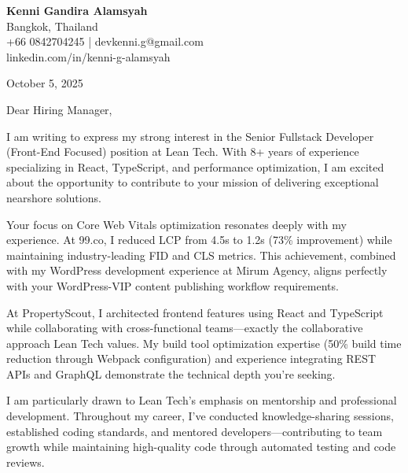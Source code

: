 \documentclass[11pt,a4paper]{article}
\begin{document}
\begin{flushleft}
\textbf{\Large Kenni Gandira Alamsyah}\\
Bangkok, Thailand\\
+66 0842704245 | devkenni.g@gmail.com\\
linkedin.com/in/kenni-g-alamsyah
\end{flushleft}

\vspace{1em}

October 5, 2025

\vspace{1em}

Dear Hiring Manager,

\vspace{1em}

I am writing to express my strong interest in the Senior Fullstack Developer (Front-End Focused) position at Lean Tech. With 8+ years of experience specializing in React, TypeScript, and performance optimization, I am excited about the opportunity to contribute to your mission of delivering exceptional nearshore solutions.

\vspace{1em}

Your focus on Core Web Vitals optimization resonates deeply with my experience. At 99.co, I reduced LCP from 4.5s to 1.2s (73\% improvement) while maintaining industry-leading FID and CLS metrics. This achievement, combined with my WordPress development experience at Mirum Agency, aligns perfectly with your WordPress-VIP content publishing workflow requirements.

\vspace{1em}

At PropertyScout, I architected frontend features using React and TypeScript while collaborating with cross-functional teams---exactly the collaborative approach Lean Tech values. My build tool optimization expertise (50\% build time reduction through Webpack configuration) and experience integrating REST APIs and GraphQL demonstrate the technical depth you're seeking.

\vspace{1em}

I am particularly drawn to Lean Tech's emphasis on mentorship and professional development. Throughout my career, I've conducted knowledge-sharing sessions, established coding standards, and mentored developers---contributing to team growth while maintaining high-quality code through automated testing and code reviews.
\end{document}
